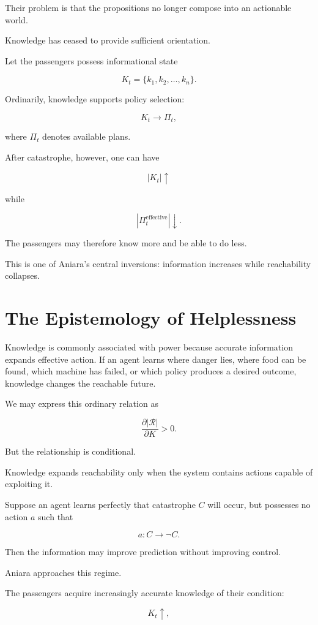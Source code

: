 \documentclass[11pt,oneside]{book}
\theoremstyle{definition}
\theoremstyle{remark}
\newcommand{\R}{\mathcal{R}}
\begin{document}
Their problem is that the propositions no longer compose into an actionable world.

Knowledge has ceased to provide sufficient orientation.

Let the passengers possess informational state

\[
K_t=\{k_1,k_2,\ldots,k_n\}.
\]

Ordinarily, knowledge supports policy selection:

\[
K_t\rightarrow\Pi_t,
\]

where \(\Pi_t\) denotes available plans.

After catastrophe, however, one can have

\[
|K_t|\uparrow
\]

while

\[
|\Pi_t^{\mathrm{effective}}|\downarrow.
\]

The passengers may therefore know more and be able to do less.

This is one of Aniara's central inversions: information increases while reachability collapses.

\section{The Epistemology of Helplessness}

Knowledge is commonly associated with power because accurate information expands effective action. If an agent learns where danger lies, where food can be found, which machine has failed, or which policy produces a desired outcome, knowledge changes the reachable future.

We may express this ordinary relation as

\[
\frac{\partial |\R|}
{\partial K}>0.
\]

But the relationship is conditional.

Knowledge expands reachability only when the system contains actions capable of exploiting it.

Suppose an agent learns perfectly that catastrophe \(C\) will occur, but possesses no action \(a\) such that

\[
a:C\rightarrow\neg C.
\]

Then the information may improve prediction without improving control.

Aniara approaches this regime.

The passengers acquire increasingly accurate knowledge of their condition:

\[
K_t\uparrow,
\]
\end{document}
